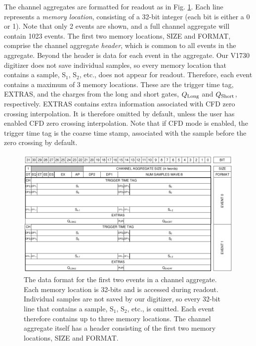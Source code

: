The channel aggregates are formatted for readout as in Fig. \ref{fig:ChannelAgg}. Each line represents a \emph{memory location}, consisting of a 32-bit integer (each bit is either a 0 or 1). Note that only 2 events are shown, and a full channel aggregate will contain 1023 events. The first two memory locations, SIZE and FORMAT, comprise the channel aggregate \emph{header}, which is common to all events in the aggregate. Beyond the header is data for each event in the aggregate. Our V1730 digitizer does not save individual samples, so every memory location that contains a sample, S$_{1}$, S$_{2}$, etc., does not appear for readout. Therefore, each event contains a maximum of 3 memory locations. These are the trigger time tag, EXTRAS, and the charges from the long and short gates, $Q_{\textnormal{Long}}$ and $Q_{\textnormal{Short}}$, respectively. EXTRAS contains extra information associated with CFD zero crossing interpolation. It is therefore omitted by default, unless the user has enabled CFD zero crossing interpolation. Note that if CFD mode is enabled, the trigger time tag is the coarse time stamp, associated with the sample before the zero crossing by default.

\begin{figure}[t]
\centering
\includegraphics[width=6.5in]{Chapter-5/figs/ChannelAgg.png}
\caption{\label{fig:ChannelAgg}The data format for the first two events in a channel aggregate. Each memory location is 32-bits and is accessed during readout. Individual samples are not saved by our digitizer, so every 32-bit line that contains a sample, S$_{1}$, S$_{2}$, etc., is omitted. Each event therefore contains up to three memory locations. The channel aggregate itself has a header consisting of the first two memory locations, SIZE and FORMAT.}
\end{figure}


